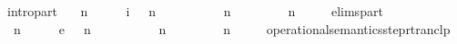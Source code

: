 \begin{isabellebody}
\ \ intro{\isacharunderscore}part{\isacharcolon}\isanewline
\ \ {\isacartoucheopen}{\isacharparenleft}{\isasymGamma}\ n\ {\isasymturnstile}\ {\isasymPsi}\ {\isasymtriangleright}\ {\isasymPhi}\ \ {\isasymhookrightarrow}\isactrlsub i\ \ {\isacharparenleft}{\isasymGamma}\ n\ {\isasymturnstile}\ {\isasymPsi}\ {\isasymtriangleright}\ {\isasymPhi}\isanewline
\ \ \ \ {\isasymLongrightarrow}\ {\isacharparenleft}{\isasymGamma}\ n\ {\isasymturnstile}\ {\isasymPsi}\ {\isasymtriangleright}\ {\isasymPhi}\ \ {\isasymhookrightarrow}\ \ {\isacharparenleft}{\isasymGamma}\ n\ {\isasymturnstile}\ {\isasymPsi}\ {\isasymtriangleright}\ {\isasymPhi}\isanewline
{\isacharbar}\ elims{\isacharunderscore}part{\isacharcolon}\isanewline
\ \ {\isacartoucheopen}{\isacharparenleft}{\isasymGamma}\ n\ {\isasymturnstile}\ {\isasymPsi}\ {\isasymtriangleright}\ {\isasymPhi}\ \ {\isasymhookrightarrow}\isactrlsub e\ \ {\isacharparenleft}{\isasymGamma}\ n\ {\isasymturnstile}\ {\isasymPsi}\ {\isasymtriangleright}\ {\isasymPhi}\isanewline
\ \ \ \ {\isasymLongrightarrow}\ {\isacharparenleft}{\isasymGamma}\ n\ {\isasymturnstile}\ {\isasymPsi}\ {\isasymtriangleright}\ {\isasymPhi}\ \ {\isasymhookrightarrow}\ \ {\isacharparenleft}{\isasymGamma}\ n\ {\isasymturnstile}\ {\isasymPsi}\ {\isasymtriangleright}\ {\isasymPhi}\isanewline
\isanewline
{}\isamarkupfalse%
\ operational{\isacharunderscore}semantics{\isacharunderscore}step{\isacharunderscore}rtranclp\isanewline

\end{isabellebody}
